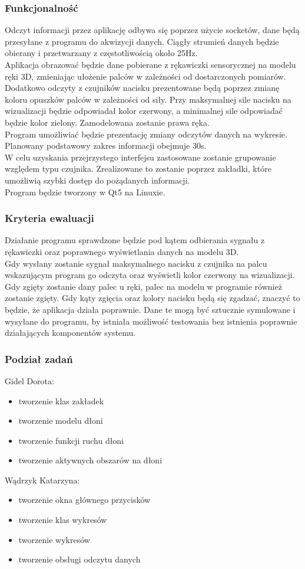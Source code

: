\documentclass{article}
\begin{document}
\subsubsection{Funkcjonalność}
Odczyt informacji przez aplikację odbywa się poprzez użycie socketów, dane będą przesyłane z programu do akwizycji danych. Ciągły strumień danych będzie obierany i przetwarzany z częstotliwością około 25Hz.\\
Aplikacja obrazować będzie dane pobierane z rękawiczki sensorycznej na modelu ręki 3D, zmieniając ułożenie palców w zależności od dostarczonych pomiarów. Dodatkowo odczyty z czujników nacisku prezentowane będą poprzez zmianę koloru opuszków palców w zależności od siły. Przy maksymalnej sile nacisku na wizualizacji będzie odpowiadał kolor czerwony, a minimalnej sile odpowiadać będzie kolor zielony. Zamodelowana zostanie prawa ręka.\\
Program umożliwiać będzie prezentację zmiany odczytów danych na wykresie. Planowany podstawowy zakres informacji obejmuje 30s. \\
W celu uzyskania przejrzystego interfejsu zastosowane zostanie grupowanie względem typu czujnika. Zrealizowane to zostanie poprzez zakładki, które umożliwią szybki dostęp do pożądanych informacji. \\
Program będzie tworzony w Qt5 na Linuxie.
\subsubsection{Kryteria ewaluacji}
Działanie programu sprawdzone będzie pod kątem odbierania sygnału z rękawiczki oraz poprawnego wyświetlania danych na modelu 3D. \\
Gdy wysłany zostanie sygnał maksymalnego nacisku z czujnika na palcu wskazującym program go odczyta oraz wyświetli kolor czerwony na wizualizacji. Gdy zgięty zostanie dany palec u ręki, palec na modelu w programie również zostanie zgięty. Gdy kąty zgięcia oraz kolory nacisku będą się zgadzać, znaczyć to będzie, że aplikacja działa poprawnie. Dane te mogą być sztucznie symulowane i wysyłane do programu, by istniała możliwość testowania bez istnienia poprawnie działających komponentów systemu.
\subsubsection{Podział zadań}
Gidel Dorota:
\begin{itemize}
    \item tworzenie klas zakładek
    \item tworzenie modelu dłoni
    \item tworzenie funkcji ruchu dłoni
    \item tworzenie aktywnych obszarów na dłoni
\end{itemize}
Wądrzyk Katarzyna:
\begin{itemize}
    \item tworzenie okna głównego przycisków
    \item tworzenie klas wykresów
    \item tworzenie wykresów
    \item tworzenie obsługi odczytu danych
\end{itemize}
\end{document}
